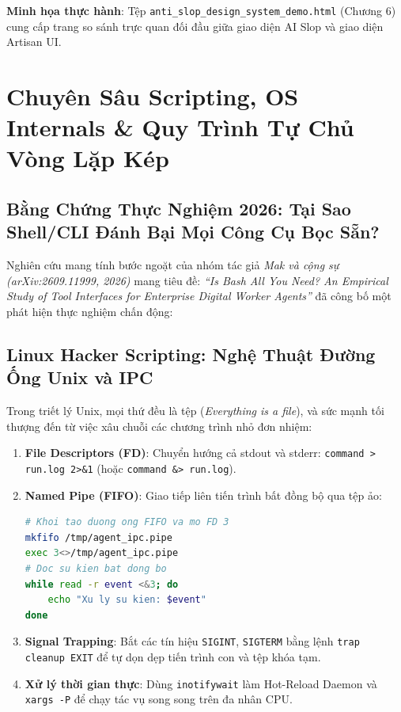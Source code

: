 \documentclass[a4paper,11pt]{report}
\begin{document}
\noindent\textbf{Minh họa thực hành}: Tệp \texttt{anti\_slop\_design\_system\_demo.html} (Chương 6) cung cấp trang so sánh trực quan đối đầu giữa giao diện AI Slop và giao diện Artisan UI.

\chapter{Chuyên Sâu Scripting, OS Internals \& Quy Trình Tự Chủ Vòng Lặp Kép}

\section{Bằng Chứng Thực Nghiệm 2026: Tại Sao Shell/CLI Đánh Bại Mọi Công Cụ Bọc Sẵn?}
Nghiên cứu mang tính bước ngoặt của nhóm tác giả \textit{Mak và cộng sự (arXiv:2609.11999, 2026)} mang tiêu đề: \textit{``Is Bash All You Need? An Empirical Study of Tool Interfaces for Enterprise Digital Worker Agents''} đã công bố một phát hiện thực nghiệm chấn động:
\begin{center}
\end{center}

\section{Linux Hacker Scripting: Nghệ Thuật Đường Ống Unix và IPC}
Trong triết lý Unix, mọi thứ đều là tệp (\textit{Everything is a file}), và sức mạnh tối thượng đến từ việc xâu chuỗi các chương trình nhỏ đơn nhiệm:
\begin{enumerate}[label={\arabic*.}]
    \item \textbf{File Descriptors (FD)}: Chuyển hướng cả stdout và stderr: \texttt{command > run.log 2>\&1} (hoặc \texttt{command \&> run.log}).
    \item \textbf{Named Pipe (FIFO)}: Giao tiếp liên tiến trình bất đồng bộ qua tệp ảo:
    \begin{lstlisting}[language=bash, caption={Co che Named Pipe FIFO va mo File Descriptor 3 tranh nghan EOF}]
# Khoi tao duong ong FIFO va mo FD 3
mkfifo /tmp/agent_ipc.pipe
exec 3<>/tmp/agent_ipc.pipe
# Doc su kien bat dong bo
while read -r event <&3; do
    echo "Xu ly su kien: $event"
done
    \end{lstlisting}
    \item \textbf{Signal Trapping}: Bắt các tín hiệu \texttt{SIGINT}, \texttt{SIGTERM} bằng lệnh \texttt{trap cleanup EXIT} để tự dọn dẹp tiến trình con và tệp khóa tạm.
    \item \textbf{Xử lý thời gian thực}: Dùng \texttt{inotifywait} làm Hot-Reload Daemon và \texttt{xargs -P} để chạy tác vụ song song trên đa nhân CPU.
\end{enumerate}
\end{document}

